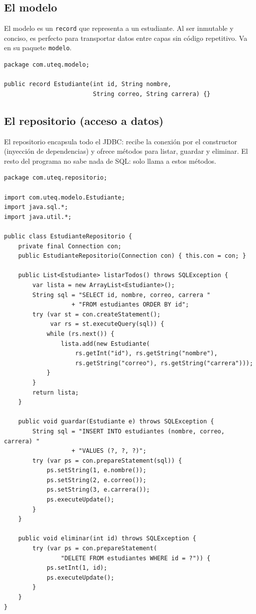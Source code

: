\documentclass[11pt]{article}
\begin{document}
\subsection{El modelo}
El modelo es un \texttt{record} que representa a un estudiante. Al ser inmutable y conciso, es perfecto para transportar datos entre capas sin código repetitivo. Va en su paquete \texttt{modelo}.

\begin{cajacodigo}
\begin{lstlisting}[style=java]
package com.uteq.modelo;

public record Estudiante(int id, String nombre,
                         String correo, String carrera) {}
\end{lstlisting}
\end{cajacodigo}
\vspace{2pt}
\subsection{El repositorio (acceso a datos)}
El repositorio encapsula todo el JDBC: recibe la conexión por el constructor (inyección de dependencias) y ofrece métodos para listar, guardar y eliminar. El resto del programa no sabe nada de SQL: solo llama a estos métodos.

\begin{cajacodigo}
\begin{lstlisting}[style=java]
package com.uteq.repositorio;

import com.uteq.modelo.Estudiante;
import java.sql.*;
import java.util.*;

public class EstudianteRepositorio {
    private final Connection con;
    public EstudianteRepositorio(Connection con) { this.con = con; }

    public List<Estudiante> listarTodos() throws SQLException {
        var lista = new ArrayList<Estudiante>();
        String sql = "SELECT id, nombre, correo, carrera "
                   + "FROM estudiantes ORDER BY id";
        try (var st = con.createStatement();
             var rs = st.executeQuery(sql)) {
            while (rs.next()) {
                lista.add(new Estudiante(
                    rs.getInt("id"), rs.getString("nombre"),
                    rs.getString("correo"), rs.getString("carrera")));
            }
        }
        return lista;
    }

    public void guardar(Estudiante e) throws SQLException {
        String sql = "INSERT INTO estudiantes (nombre, correo, carrera) "
                   + "VALUES (?, ?, ?)";
        try (var ps = con.prepareStatement(sql)) {
            ps.setString(1, e.nombre());
            ps.setString(2, e.correo());
            ps.setString(3, e.carrera());
            ps.executeUpdate();
        }
    }

    public void eliminar(int id) throws SQLException {
        try (var ps = con.prepareStatement(
                "DELETE FROM estudiantes WHERE id = ?")) {
            ps.setInt(1, id);
            ps.executeUpdate();
        }
    }
}
\end{lstlisting}
\end{cajacodigo}
\vspace{2pt}
\end{document}
